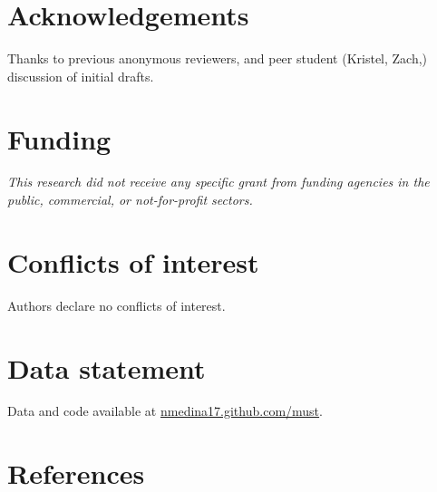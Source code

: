 \documentclass[
  12pt,
]{article}
\begin{document}
\hypertarget{acknowledgements}{%
\section{Acknowledgements}\label{acknowledgements}}

Thanks to previous anonymous reviewers, and peer student (Kristel, Zach,) discussion of initial drafts.

\hypertarget{funding}{%
\section{Funding}\label{funding}}

\emph{This research did not receive any specific grant from funding agencies in the public, commercial, or not-for-profit sectors.}

\hypertarget{conflicts-of-interest}{%
\section{Conflicts of interest}\label{conflicts-of-interest}}

Authors declare no conflicts of interest.

\hypertarget{data-statement}{%
\section{Data statement}\label{data-statement}}

Data and code available at \url{nmedina17.github.com/must}.

\newpage

\hypertarget{references}{%
\section*{References}\label{references}}
\end{document}
